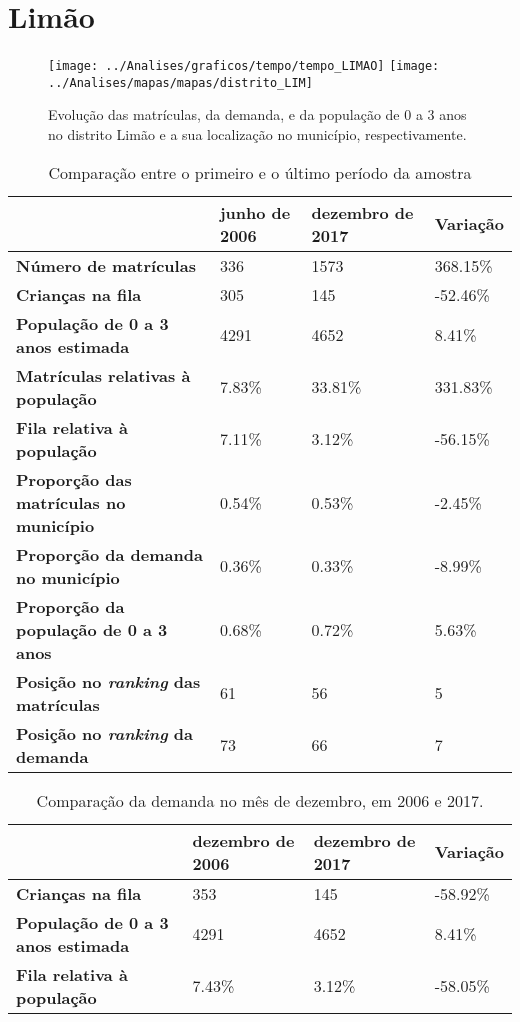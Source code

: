 \section{Limão}
\begin{figure}[H]
	\centering
	\texttt{[image: ../Analises/graficos/tempo/tempo\_LIMAO]}
	\texttt{[image: ../Analises/mapas/mapas/distrito\_LIM]}
	\caption{Evolução das matrículas, da demanda, e da população de 0 a 3 anos no distrito Limão e a sua localização no município, respectivamente.}
\end{figure}
\begin{table}[H]
	\begin{tabular}{|l|l|l|l|}
		\hline
		\textbf{}                                      & \textbf{junho de 2006}       & \textbf{dezembro de 2017}    & \textbf{Variação} \\ \hline
		\textbf{Número de matrículas}                  & 336 & 1573 & 368.15\% \\ \hline
		\textbf{Crianças na fila}                      & 305 & 145 & -52.46\% \\ \hline
		\textbf{População de 0 a 3 anos estimada}      & 4291 & 4652 & 8.41\% \\ \hline
		\textbf{Matrículas relativas à população}      & 7.83\% & 33.81\% & 331.83\% \\ \hline
		\textbf{Fila relativa à população}             & 7.11\% & 3.12\% & -56.15\% \\ \hline
		\textbf{Proporção das matrículas no município} & 0.54\% & 0.53\% & -2.45\% \\ \hline
		\textbf{Proporção da demanda no município}     & 0.36\% & 0.33\% & -8.99\% \\ \hline
		\textbf{Proporção da população de 0 a 3 anos}  & 0.68\% & 0.72\% & 5.63\% \\ \hline
		\textbf{Posição no \textit{ranking} das matrículas}     & 61 & 56 & 5 \\ \hline
		\textbf{Posição no \textit{ranking} da demanda}         & 73 & 66 & 7 \\ \hline
	\end{tabular}
	\caption{Comparação entre o primeiro e o último período da amostra}
\end{table}
\begin{table}[H]
	\begin{tabular}{|l|l|l|l|}
		\hline
		\textbf{}                                 & \textbf{dezembro de 2006} & \textbf{dezembro de 2017} & \textbf{Variação} \\ \hline
		\textbf{Crianças na fila}                      & 353 & 145 & -58.92\% \\ \hline
		\textbf{População de 0 a 3 anos estimada}      & 4291 & 4652 & 8.41\% \\ \hline
		\textbf{Fila relativa à população}             & 7.43\% & 3.12\% & -58.05\% \\ \hline
	\end{tabular}
	\caption{Comparação da demanda no mês de dezembro, em 2006 e 2017.}
\end{table}
